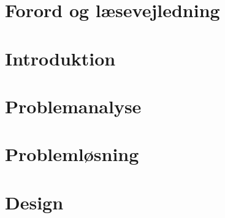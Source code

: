 



\frontmatter

 \clearpage 
\chapter*{Forord og læsevejledning}

\newpage

\tableofcontents*

\mainmatter

\chapter{Introduktion}\vspace{-.75cm}


\chapter{Problemanalyse}\vspace{-.75cm}









\chapter{Problemløsning}\vspace{-.75cm}















\chapter{Design}\vspace{-.75cm}



\begingroup
\raggedright


\endgroup

\begin{appendices}
	
\end{appendices}


